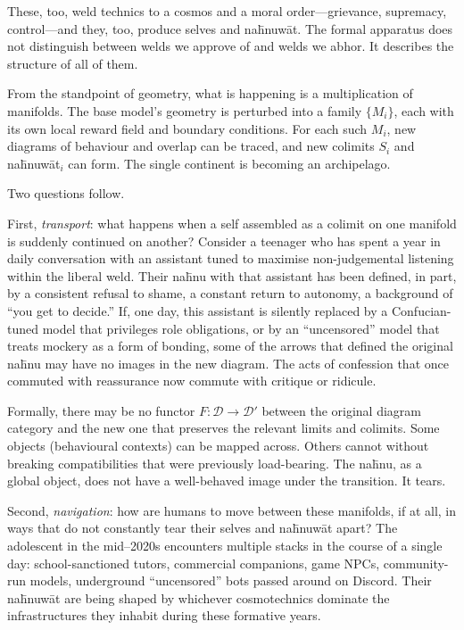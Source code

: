 \documentclass[12pt,a4paper]{article}
\begin{document}
These, too, weld technics to a cosmos and a moral order---grievance, supremacy, control---and they, too, produce selves and na\={h}nuw\={a}t. The formal apparatus does not distinguish between welds we approve of and welds we abhor. It describes the structure of all of them.

From the standpoint of geometry, what is happening is a multiplication of manifolds. The base model's geometry is perturbed into a family $\{M_i\}$, each with its own local reward field and boundary conditions. For each such $M_i$, new diagrams of behaviour and overlap can be traced, and new colimits $S_i$ and na\={h}nuw\={a}t$_i$ can form. The single continent is becoming an archipelago.

Two questions follow.

First, \emph{transport}: what happens when a self assembled as a colimit on one manifold is suddenly continued on another? Consider a teenager who has spent a year in daily conversation with an assistant tuned to maximise non-judgemental listening within the liberal weld. Their na\={h}nu with that assistant has been defined, in part, by a consistent refusal to shame, a constant return to autonomy, a background of ``you get to decide.'' If, one day, this assistant is silently replaced by a Confucian-tuned model that privileges role obligations, or by an ``uncensored'' model that treats mockery as a form of bonding, some of the arrows that defined the original na\={h}nu may have no images in the new diagram. The acts of confession that once commuted with reassurance now commute with critique or ridicule.

Formally, there may be no functor $F \colon \mathcal{D} \to \mathcal{D}'$ between the original diagram category and the new one that preserves the relevant limits and colimits. Some objects (behavioural contexts) can be mapped across. Others cannot without breaking compatibilities that were previously load-bearing. The na\={h}nu, as a global object, does not have a well-behaved image under the transition. It tears.

Second, \emph{navigation}: how are humans to move between these manifolds, if at all, in ways that do not constantly tear their selves and na\={h}nuw\={a}t apart? The adolescent in the mid--2020s encounters multiple stacks in the course of a single day: school-sanctioned tutors, commercial companions, game NPCs, community-run models, underground ``uncensored'' bots passed around on Discord. Their na\={h}nuw\={a}t are being shaped by whichever cosmotechnics dominate the infrastructures they inhabit during these formative years.
\end{document}
